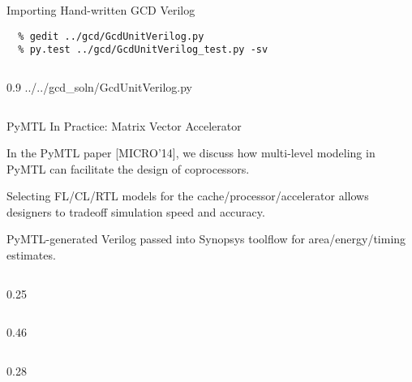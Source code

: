 \begin{task}\begin{frame}[fragile]{Importing Hand-written GCD Verilog}

\vspace{-0.15in}
\begin{Verbatim}[commandchars=\\\{\}]
  % cd \midtilde/pymtl-tut/build
  % gedit ../gcd/GcdUnitVerilog.py
  % py.test ../gcd/GcdUnitVerilog_test.py -sv
\end{Verbatim}

\vspace{-0.1in}
\begin{cbxcols}
\begin{column}{0.9\tw}
%
{../../gcd_soln/GcdUnitVerilog.py}
  \end{column}
\end{cbxcols}

\end{frame}
\end{task}

\begin{frame}{PyMTL In Practice: Matrix Vector Accelerator}

\begin{cbxlist}

  \1 In the PyMTL paper [MICRO'14], we discuss how multi-level modeling
     in PyMTL can facilitate the design of coprocessors.

  \1 Selecting FL/CL/RTL models for the cache/processor/accelerator
     allows designers to tradeoff simulation speed and accuracy.

  \1 PyMTL-generated Verilog passed into Synopsys toolflow for
     area/energy/timing estimates.

\end{cbxlist}

  \medskip\smallskip
  \begin{cbxcols}

  \begin{column}{0.25\tw}
  \end{column}

  \begin{column}{0.46\tw}
  \end{column}

  \begin{column}{0.28\tw}
  \end{column}

  \end{cbxcols}

\end{frame}

